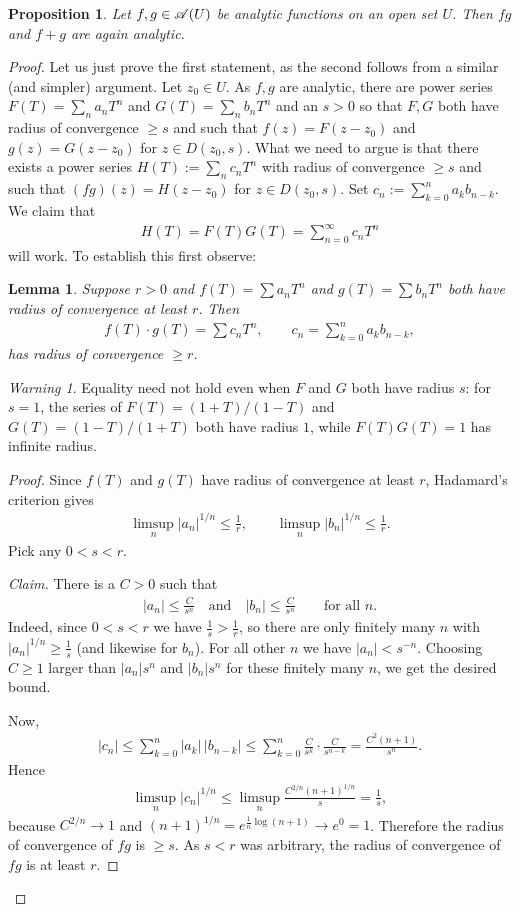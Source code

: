 \documentclass[11pt]{article}
\theoremstyle{plain}
\newtheorem{proposition}[theorem]{Proposition}
\newtheorem{lemma}[theorem]{Lemma}
\theoremstyle{definition}
\theoremstyle{remark}
\newtheorem*{warning}{Warning}
\numberwithin{equation}{section}
\newcommand{\be}{\begin{eqnarray}}
\newcommand{\ee}{\end{eqnarray}}
\begin{document}
\begin{proposition} Let $f, g \in \mathscr{A}(U)$ be analytic functions on an open set $U$. Then $fg$ and $f+g$ are again analytic. \end{proposition}
\begin{proof} Let us just prove the first statement, as the second follows from a similar (and simpler) argument. Let $z_0 \in U$. As $f, g$ are analytic, there are power series $F(T)= \sum_{n} a_n T^n$ and $G(T) =\sum_n b_n T^n$ and an $s > 0$ so that $F, G$ both have radius of convergence $\geq s$ and such that $f(z) = F( z- z_0)$ and $g(z)=G(z-z_0)$ for $z \in D(z_0, s)$. What we need to argue is that there exists a power series $H(T):= \sum_{n}c_n T^n$ with radius of convergence $\geq s$ and such that $(f g)(z)= H(z - z_0)$ for $z \in D(z_0, s)$.  Set $c_n:=\sum_{k=0}^n a_k b_{n-k}.$ We claim that \be H(T)= F(T) G(T) = \sum_{n=0}^{\infty}c_nT^n \ee will work.  To establish this first observe:

\begin{lemma}
	\label{prop:prod-roc}
	Suppose $r>0$ and $f(T)=\sum a_nT^n$ and $g(T)=\sum b_nT^n$ both have radius
	of convergence at least $r$. Then
	\be
	f(T)\cdot g(T)=\sum c_nT^n,\qquad c_n=\sum_{k=0}^{n}a_kb_{n-k},
	\ee
	has radius of convergence $\geq r$.
\end{lemma}

\begin{warning}
Equality need not hold even when $F$ and $G$ both have radius $s$: for $s=1$, the series of $F(T)=(1+T)/(1-T)$ and $G(T)=(1-T)/(1+T)$ both have radius $1$, while $F(T)G(T)=1$ has infinite radius.
\end{warning}
\begin{proof}
	Since $f(T)$ and $g(T)$ have radius of convergence at least $r$, Hadamard's
	criterion gives
	\be
	\limsup_n|a_n|^{1/n}\leq\frac1r,\qquad\limsup_n|b_n|^{1/n}\leq\frac1r.
	\ee
	Pick any $0<s<r$.

	\emph{Claim.} There is a $C>0$ such that
	\be
	|a_n|\leq\frac C{s^n}\quad\text{and}\quad|b_n|\leq\frac C{s^n}
	\qquad\text{for all }n.
	\ee
	Indeed, since $0<s<r$ we have $\frac1s>\frac1r$, so there are only finitely
	many $n$ with $|a_n|^{1/n}\geq\frac1s$ (and likewise for $b_n$). For all
	other $n$ we have $|a_n|<s^{-n}$. Choosing $C\geq1$ larger than $|a_n|s^n$
	and $|b_n|s^n$ for these finitely many $n$, we get the desired bound.

	Now,
	\be
	|c_n|\leq\sum_{k=0}^{n}|a_k|\,|b_{n-k}|
	\leq\sum_{k=0}^{n}\frac C{s^k}\cdot\frac C{s^{n-k}}
	=\frac{C^2(n+1)}{s^n}.
	\ee
	Hence
	\be
	\limsup_n|c_n|^{1/n}\leq\limsup_n\frac{C^{2/n}(n+1)^{1/n}}{s}=\frac1s,
	\ee
	because $C^{2/n}\to1$ and $(n+1)^{1/n}=e^{\frac1n\log(n+1)}\to e^0=1$.
	Therefore the radius of convergence of $f g$ is $\geq s$. As $s<r$ was
	arbitrary, the radius of convergence of $f g$ is at least $r$.
\end{proof}






\end{proof}
\end{document}
